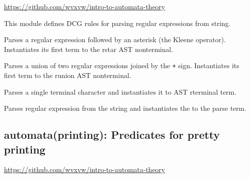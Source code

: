 \begin{tags}
\url{https://github.com/wvxvw/intro-to-automata-theory}
\end{tags}

This module defines DCG rules for parsing regular expressions from
string.\vspace{0.7cm}

\begin{description}
Parses a regular expression followed by an asterisk (the Kleene
operator). Instantiates its first term to the rstar AST nonterminal.

\begin{tags}
\end{tags}

Parses a union of two regular expressions joined by the \verb$+$ sign.
Instantiates its first term to the runion AST nonterminal.

\begin{tags}
\end{tags}

Parses a single terminal character and instantiates it to
AST rterminal term.

\begin{tags}
\end{tags}

Parses regular expression from the string  and instantiates
the  to the parse  term.

\begin{tags}
\end{tags}
\end{description}

\subsection{automata(printing): Predicates for pretty printing}

\label{sec:printing}

\begin{tags}
\url{https://github.com/wvxvw/intro-to-automata-theory}
\end{tags}

